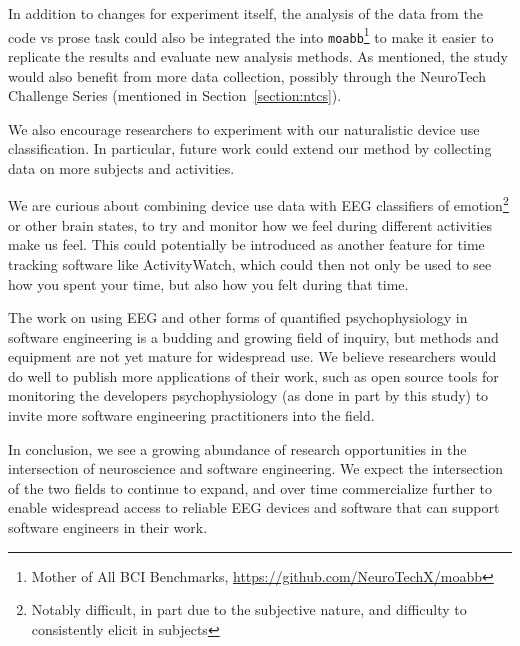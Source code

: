 In addition to changes for experiment itself, the analysis of the data from the code vs prose task could also be integrated the into \texttt{moabb}\footnote{Mother of All BCI Benchmarks, \url{https://github.com/NeuroTechX/moabb}} to make it easier to replicate the results and evaluate new analysis methods. As mentioned, the study would also benefit from more data collection, possibly through the NeuroTech Challenge Series (mentioned in Section~\ref{section:ntcs}).

We also encourage researchers to experiment with our naturalistic device use classification. In particular, future work could extend our method by collecting data on more subjects and activities.

We are curious about combining device use data with EEG classifiers of emotion\footnote{Notably difficult, in part due to the subjective nature, and difficulty to consistently elicit in subjects} or other brain states, to try and monitor how we feel during different activities make us feel. This could potentially be introduced as another feature for time tracking software like ActivityWatch, which could then not only be used to see how you spent your time, but also how you felt during that time.

The work on using EEG and other forms of quantified psychophysiology in software engineering is a budding and growing field of inquiry, but methods and equipment are not yet mature for widespread use. We believe researchers would do well to publish more applications of their work, such as open source tools for monitoring the developers psychophysiology (as done in part by this study) to invite more software engineering practitioners into the field.


In conclusion, we see a growing abundance of research opportunities in the intersection of neuroscience and software engineering. We expect the intersection of the two fields to continue to expand, and over time commercialize further to enable widespread access to reliable EEG devices and software that can support software engineers in their work.
